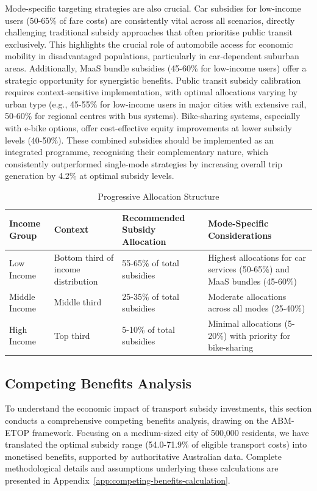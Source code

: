 \documentclass[a4paper,fleqn]{cas-sc}
\begin{document}
Mode-specific targeting strategies are also crucial. Car subsidies for low-income users (50-65\% of fare costs) are consistently vital across all scenarios, directly challenging traditional subsidy approaches that often prioritise public transit exclusively. This highlights the crucial role of automobile access for economic mobility in disadvantaged populations, particularly in car-dependent suburban areas. Additionally, MaaS bundle subsidies (45-60\% for low-income users) offer a strategic opportunity for synergistic benefits. Public transit subsidy calibration requires context-sensitive implementation, with optimal allocations varying by urban type (e.g., 45-55\% for low-income users in major cities with extensive rail, 50-60\% for regional centres with bus systems). Bike-sharing systems, especially with e-bike options, offer cost-effective equity improvements at lower subsidy levels (40-50\%). These combined subsidies should be implemented as an integrated programme, recognising their complementary nature, which consistently outperformed single-mode strategies by increasing overall trip generation by 4.2\% at optimal subsidy levels.


\begin{table}[H]
\centering
\caption{Progressive Allocation Structure}
\label{tab:progressive_structure}
\begin{tabular}{p{2.5cm}p{4cm}p{3cm}p{4cm}}
\toprule
\textbf{Income Group} & \textbf{Context} & \textbf{Recommended Subsidy Allocation} & \textbf{Mode-Specific Considerations} \\
\midrule
Low Income & Bottom third of income distribution & 55-65\% of total subsidies & Highest allocations for car services (50-65\%) and MaaS bundles (45-60\%) \\
\midrule
Middle Income & Middle third & 25-35\% of total subsidies & Moderate allocations across all modes (25-40\%) \\
\midrule
High Income & Top third & 5-10\% of total subsidies & Minimal allocations (5-20\%) with priority for bike-sharing \\
\bottomrule
\end{tabular}
\end{table}

\subsection{Competing Benefits Analysis}\label{sec:competing-benefits}

To understand the economic impact of transport subsidy investments, this section conducts a comprehensive competing benefits analysis, drawing on the ABM-ETOP framework. Focusing on a medium-sized city of 500,000 residents, we have translated the optimal subsidy range (54.0-71.9\% of eligible transport costs) into monetised benefits, supported by authoritative Australian data. Complete methodological details and assumptions underlying these calculations are presented in Appendix~\ref{app:competing-benefits-calculation}.
\end{document}
